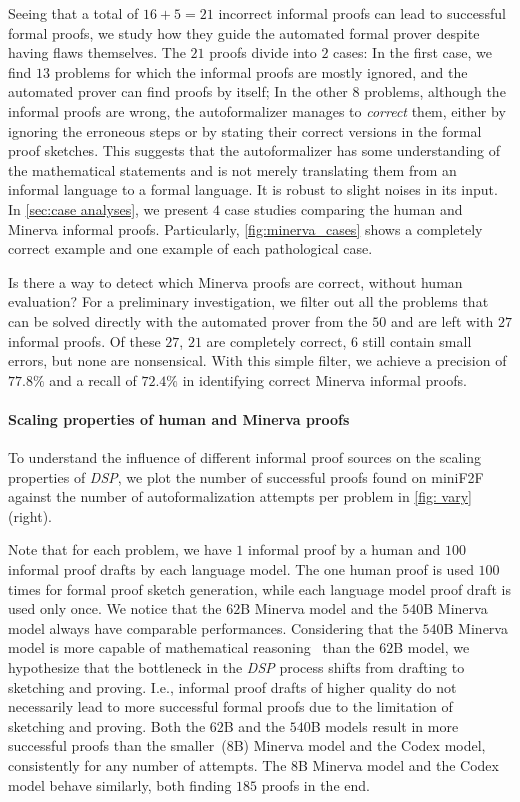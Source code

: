  Seeing that a total of $16+5=21$ incorrect informal proofs can lead to successful formal proofs, we study how they guide the automated formal prover despite having flaws themselves. The $21$ proofs divide into $2$ cases: In the first case, we find $13$ problems for which the informal proofs are mostly ignored, and the automated prover can find proofs by itself; In the other $8$ problems, although the informal proofs are wrong, the autoformalizer manages to \textit{correct} them, either by ignoring the erroneous steps or by stating their correct versions in the formal proof sketches. This suggests that the autoformalizer has some understanding of the mathematical statements and is not merely translating them from an informal language to a formal language. It is robust to slight noises in its input. In \autoref{sec:case analyses}, we present $4$ case studies comparing the human and Minerva informal proofs. Particularly, \autoref{fig:minerva_cases} shows a completely correct example and one example of each pathological case.

Is there a way to detect which Minerva proofs are correct, without human evaluation? For a preliminary investigation, we filter out all the problems that can be solved directly with the automated prover from the $50$ and are left with $27$ informal proofs. Of these $27$, $21$ are completely correct, $6$ still contain small errors, but none are nonsensical. With this simple filter, we achieve a precision of $77.8\%$ and a recall of $72.4\%$ in identifying correct Minerva informal proofs.

\paragraph{Scaling properties of human and Minerva proofs}

To understand the influence of different informal proof sources on the scaling properties of \textit{DSP}, we plot the number of successful proofs found on miniF2F against the number of autoformalization attempts per problem in \autoref{fig: vary} (right).

Note that for each problem, we have $1$ informal proof by a human and $100$ informal proof drafts by each language model. The one human proof is used $100$ times for formal proof sketch generation, while each language model proof draft is used only once. We notice that the $62$B Minerva model and the $540$B Minerva model always have comparable performances. Considering that the $540$B Minerva model is more capable of mathematical reasoning~\citep[Table 3]{lewkowycz2022solving} than the $62$B model, we hypothesize that the bottleneck in the \textit{DSP} process shifts from drafting to sketching and proving. I.e., informal proof drafts of higher quality do not necessarily lead to more successful formal proofs due to the limitation of sketching and proving. Both the $62$B and the $540$B models result in more successful proofs than the smaller~($8$B) Minerva model and the Codex model, consistently for any number of attempts. The $8$B Minerva model and the Codex model behave similarly, both finding $185$ proofs in the end.

